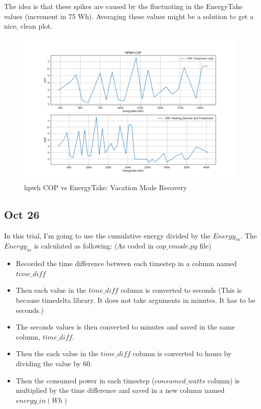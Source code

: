 The idea is that these spikes are caused by the fluctuating in the EnergyTake values (increment in 75 Wh). Averaging these values might be a solution to get a nice, clean plot.


\begin{figure}[htp!]
    \centering
    \includegraphics[width=0.9\columnwidth]{Pictures/cop_vs_EnergyTake_var.png}
    \caption{\gls{hpwh} COP vs EnergyTake: Vacation Mode Recovery}
    \label{fig:copET7_5}
\end{figure}

\subsection{Oct 26}

In this trial, I'm going to use the cumulative energy divided by the $Energy_{in}$. The $Energy_{in}$ is calculated as
following: (As coded in $cop\_vmode.py$ file)
\begin{itemize}
    \item Recorded the time difference between each timestep in a column named $time\_diff$
    \item Then each value in the $time\_diff$ column is converted to seconds (This is because timedelta library. It does
        not take arguments in minutes. It has to be seconds.)
    \item The seconds values is then converted to minutes and saved in the same column, $time\_diff$.
    \item Then the each value in the $time\_diff$ column is converted to hours by dividing the value by 60.
    \item Then the consumed power in each timestep ($consumed\_watts$ column) is multiplied by the time difference and
        saved in a new column named $energy\_in (Wh)$
\end{itemize}

